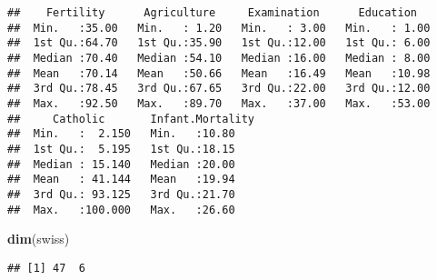 \documentclass[]{article}
\newenvironment{Shaded}{\begin{snugshade}}{\end{snugshade}}
\newcommand{\CommentTok}[1]{\textcolor[rgb]{0.56,0.35,0.01}{\textit{#1}}}
\newcommand{\KeywordTok}[1]{\textcolor[rgb]{0.13,0.29,0.53}{\textbf{#1}}}
\newcommand{\NormalTok}[1]{#1}
\begin{document}
\begin{Shaded}
\end{Shaded}

\begin{verbatim}
##    Fertility      Agriculture     Examination      Education    
##  Min.   :35.00   Min.   : 1.20   Min.   : 3.00   Min.   : 1.00  
##  1st Qu.:64.70   1st Qu.:35.90   1st Qu.:12.00   1st Qu.: 6.00  
##  Median :70.40   Median :54.10   Median :16.00   Median : 8.00  
##  Mean   :70.14   Mean   :50.66   Mean   :16.49   Mean   :10.98  
##  3rd Qu.:78.45   3rd Qu.:67.65   3rd Qu.:22.00   3rd Qu.:12.00  
##  Max.   :92.50   Max.   :89.70   Max.   :37.00   Max.   :53.00  
##     Catholic       Infant.Mortality
##  Min.   :  2.150   Min.   :10.80   
##  1st Qu.:  5.195   1st Qu.:18.15   
##  Median : 15.140   Median :20.00   
##  Mean   : 41.144   Mean   :19.94   
##  3rd Qu.: 93.125   3rd Qu.:21.70   
##  Max.   :100.000   Max.   :26.60
\end{verbatim}

\begin{Shaded}
\begin{Highlighting}[]
\KeywordTok{dim}\NormalTok{(swiss)}
\end{Highlighting}
\end{Shaded}

\begin{verbatim}
## [1] 47  6
\end{verbatim}
\end{document}
